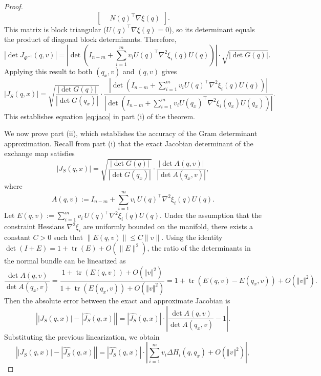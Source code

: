 \documentclass[10pt,a4paper]{amsart}
\begin{document}
\begin{proof}
\[\begin{bmatrix}
&
N(q)^\top \nabla\xi(q)
\end{bmatrix}.
\]
This matrix is block triangular ($U(q)^\top \nabla\xi(q)=0$), so its determinant equals the product of diagonal block determinants. Therefore,
\[
|\det J_{\Phi^{-1}}(q,v)|
=
\left|
\det\!\left(
I_{n-m}
+
\sum_{i=1}^m v_i U(q)^\top \nabla^2\xi_i(q) U(q)
\right)
\right|
\cdot
\sqrt{|\det G(q)|}.
\]
Applying this result to both $(q_x,v)$ and $(q,v)$ gives
\[
|J_S(q,x)|
=\sqrt{\frac{|\det G(q)|}{|\det G(q_x)|}}
\cdot
\frac{
\left|
\det\!\left(
I_{n-m}
+
\sum_{i=1}^m v_i U(q)^\top \nabla^2\xi_i(q) U(q)
\right)
\right|
}{
\left|
\det\!\left(
I_{n-m}
+
\sum_{i=1}^m v_i U(q_x)^\top \nabla^2\xi_i(q_x) U(q_x)
\right)
\right|
}.
\]
This establishes equation \eqref{eq:jaco} in part (i) of the theorem.

We now prove part (ii), which establishes the accuracy of the Gram determinant approximation.
Recall from part (i) that the exact Jacobian determinant of the exchange map satisfies
\begin{equation}\nonumber
|J_S(q,x)|
=
\sqrt{\frac{|\det G(q)|}{|\det G(q_x)|}}
\cdot
\frac{|\det A(q,v)|}{|\det A(q_x,v)|},
\end{equation}
where 
\begin{equation}\nonumber A(q,v) := I_{n-m} + \sum_{i=1}^m v_i\, U(q)^\top \nabla^2\xi_i(q) U(q). \end{equation}
Let $E(q,v) := \sum_{i=1}^m v_i\, U(q)^\top \nabla^2\xi_i(q) U(q)$. Under the assumption that the constraint Hessians $\nabla^2\xi_i$ are uniformly bounded on the manifold, there exists a constant $C > 0$ such that $\|E(q,v)\| \le C \|v\|$. Using the identity $\det(I + E) = 1 + \operatorname{tr}(E) + O(\|E\|^2)$, the ratio of the determinants in the normal bundle can be linearized as
\begin{equation}\nonumber
\frac{\det A(q,v)}{\det A(q_x,v)} = \frac{1 + \operatorname{tr}(E(q,v)) + O(\Vert v\Vert^2)}{1 + \operatorname{tr}(E(q_x,v)) + O(\Vert v\Vert^2)}  = 1 + \operatorname{tr}(E(q,v) - E(q_x,v)) + O(\Vert v\Vert^2).\end{equation}
Then the absolute error between the exact and approximate Jacobian is
\begin{equation}\nonumber
\left| |J_S(q,x)| - |\widehat{J_S}(q,x)| \right| = |\widehat{J_S}(q,x)| \cdot \left| \frac{\det A(q,v)}{\det A(q_x,v)} - 1 \right|.
\end{equation}
Substituting the previous linearization, we obtain
\begin{equation}\nonumber
\left| |J_S(q,x)| - |\widehat{J_S}(q,x)| \right| = |\widehat{J_S}(q,x)| \cdot \left| \sum_{i=1}^m v_i \Delta H_i(q, q_x) + O(\Vert v\Vert^2) \right|,

\end{equation}
\end{proof}
\end{document}
